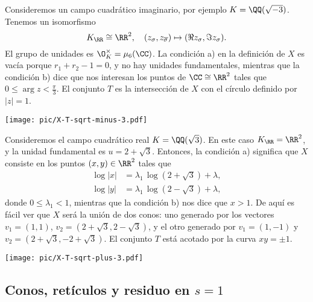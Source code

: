 \vspace{1em}

\begin{ejemplo}
  Consideremos un campo cuadrático imaginario, por ejemplo
  $K = \QQ (\sqrt{-3})$. Tenemos un isomorfismo
  \[ K_\RR \cong \RR^2, \quad
     (z_\sigma, z_{\overline{\sigma}}) \mapsto (\Re z_\sigma, \Im z_\sigma). \]
  El grupo de unidades es $\O_K^\times = \mu_6 (\CC)$. La condición a) en la
  definición de $X$ es vacía porque $r_1 + r_2 - 1 = 0$, y no hay unidades
  fundamentales, mientras que la condición b) dice que nos interesan los puntos
  de $\CC \cong \RR^2$ tales que $0 \le \arg z < \frac{\pi}{3}$. El conjunto $T$
  es la intersección de $X$ con el círculo definido por $|z| = 1$.

  \begin{center}
    \texttt{[image: pic/X-T-sqrt-minus-3.pdf]}
  \end{center}
\end{ejemplo}

\begin{ejemplo}
  Consideremos el campo cuadrático real $K = \QQ (\sqrt{3})$. En este caso
  $K_\RR = \RR^2$, y la unidad fundamental es $u = 2 + \sqrt{3}$. Entonces,
  la condición a) significa que $X$ consiste en los puntos $(x,y) \in \RR^2$
  tales que
  \begin{align*}
    \log |x| & = \lambda_1\,\log (2 + \sqrt{3}) + \lambda,\\
    \log |y| & = \lambda_1\,\log (2 - \sqrt{3}) + \lambda,
  \end{align*}
  donde $0 \le \lambda_1 < 1$, mientras que la condición b) nos dice que
  $x > 1$. De aquí es fácil ver que $X$ será la unión de dos conos: uno generado
  por los vectores $v_1 = (1,1)$, $v_2 = (2 + \sqrt{3}, 2 - \sqrt{3})$,
  y el otro generado por $v_1 = (1,-1)$ y $v_2 = (2 + \sqrt{3}, -2 + \sqrt{3})$.
  El conjunto $T$ está acotado por la curva $xy = \pm 1$.

  \begin{center}
    \texttt{[image: pic/X-T-sqrt-plus-3.pdf]}
  \end{center}
\end{ejemplo}


\subsection{Conos, retículos y residuo en $s = 1$}

